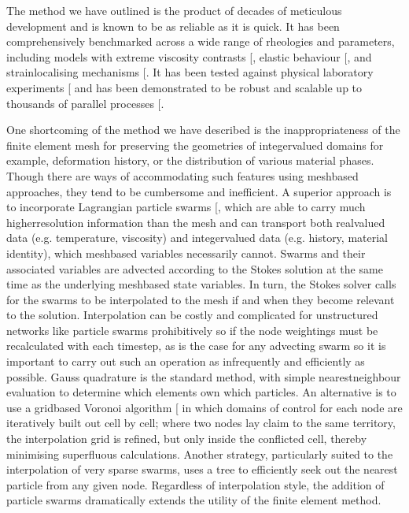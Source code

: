 \documentclass[letterpaper,10pt,english]{jupyterBook}
\begin{document}
\sphinxAtStartPar
The method we have outlined is the product of decades of meticulous development and is known to be as reliable as it is quick. It has been comprehensively benchmarked across a wide range of rheologies and parameters, including models with extreme viscosity contrasts {[}\sphinxcite{references:id544}{]}, elastic behaviour {[}\sphinxcite{references:id384}{]}, and strain\sphinxhyphen{}localising mechanisms {[}\sphinxcite{references:id383}{]}. It has been tested against physical laboratory experiments {[}\sphinxcite{references:id67}{]} and has been demonstrated to be robust and scalable up to thousands of parallel processes {[}\sphinxcite{references:id73}{]}.

\sphinxAtStartPar
One shortcoming of the method we have described is the inappropriateness of the finite element mesh for preserving the geometries of integer\sphinxhyphen{}valued domains \sphinxhyphen{} for example, deformation history, or the distribution of various material phases. Though there are ways of accommodating such features using mesh\sphinxhyphen{}based approaches, they tend to be cumbersome and inefficient. A superior approach is to incorporate Lagrangian particle swarms {[}\sphinxcite{references:id552}{]}, which are able to carry much higher\sphinxhyphen{}resolution information than the mesh and can transport both real\sphinxhyphen{}valued data (e.g. temperature, viscosity) and integer\sphinxhyphen{}valued data (e.g. history, material identity), which mesh\sphinxhyphen{}based variables necessarily cannot. Swarms and their associated variables are advected according to the Stokes solution at the same time as the underlying mesh\sphinxhyphen{}based state variables. In turn, the Stokes solver calls for the swarms to be interpolated to the mesh if and when they become relevant to the solution. Interpolation can be costly and complicated for unstructured networks like particle swarms \sphinxhyphen{} prohibitively so if the node weightings must be recalculated with each timestep, as is the case for any advecting swarm \sphinxhyphen{} so it is important to carry out such an operation as infrequently and efficiently as possible. Gauss quadrature is the standard method, with simple nearest\sphinxhyphen{}neighbour evaluation to determine which elements own which particles. An alternative is to use a grid\sphinxhyphen{}based Voronoi algorithm {[}\sphinxcite{references:id65}{]} in which domains of control for each node are iteratively built out cell by cell; where two nodes lay claim to the same territory, the interpolation grid is refined, but only inside the conflicted cell, thereby minimising superfluous calculations. Another strategy, particularly suited to the interpolation of very sparse swarms, uses a  tree to efficiently seek out the nearest particle from any given node. Regardless of interpolation style, the addition of particle swarms dramatically extends the utility of the finite element method.
\end{document}
